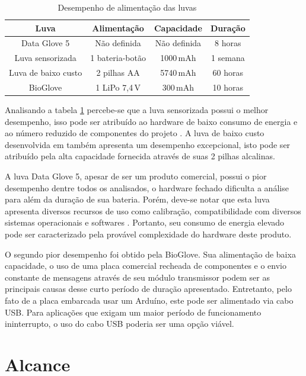 \documentclass[
	12pt,				%
	openright,			%
	oneside,			%
	a4paper,			%
	english,			%
	brazil				%
	]{abntex2}
\begin{document}
		\begin{table}[H]
  	\centering
		\caption{Desempenho de alimentação das luvas}
    \begin{tabular}{c|c|c|c}
      \midrule
			Luva 								& Alimentação			&	Capacidade	& Duração	\\
      \midrule                                            					
			Data Glove 5				& Não definida		& Não definida& 8 horas \\
			Luva sensorizada 		& 1 bateria-botão	& 1000$\,$mAh		& 1 semana\\
			Luva de baixo custo & 2 pilhas AA			& 5740$\,$mAh		& 60 horas\\
			BioGlove						& 1 LiPo 7,4$\,$V			& 300$\,$mAh			&	10 horas\\	
      \midrule
    \end{tabular}
		\label{Tab:battery-range}
		\end{table}

		Analisando a tabela \ref{Tab:battery-range} percebe-se que a luva sensorizada possui o melhor desempenho, isso pode ser atribuído ao hardware de baixo consumo de energia e ao número reduzido de componentes do projeto \cite{michela2013rehab}. A luva de baixo custo desenvolvida em \cite{simone2007lowcost} também apresenta um desempenho excepcional, isto pode ser atribuído pela alta capacidade fornecida através de suas 2 pilhas alcalinas.

		A luva Data Glove 5, apesar de ser um produto comercial, possui o pior desempenho dentre todos os analisados, o hardware fechado dificulta a análise para além da duração de sua bateria. Porém, deve-se notar que esta luva apresenta diversos recursos de uso como calibração, compatibilidade com diversos sistemas operacionais e softwares \cite{5DT-ultra}. Portanto, seu consumo de energia elevado pode ser caracterizado pela provável complexidade do hardware deste produto.

		O segundo pior desempenho foi obtido pela BioGlove. Sua alimentação de baixa capacidade, o uso de uma placa comercial recheada de componentes e o envio constante de mensagens através de seu módulo transmissor podem ser as principais causas desse curto período de duração apresentado. Entretanto, pelo fato de a placa embarcada usar um Arduíno, este pode ser alimentado via cabo USB. Para aplicações que exigam um maior período de funcionamento ininterrupto, o uso do cabo USB poderia ser uma opção viável.

			\section{Alcance}
\end{document}
